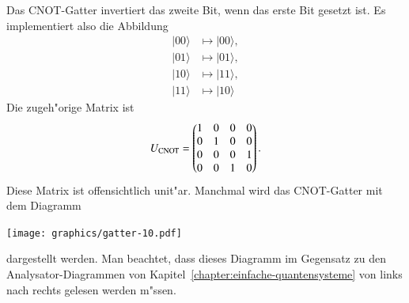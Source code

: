 \begin{beispiel}
Das \textsc{CNOT}-Gatter invertiert das zweite Bit, wenn das erste Bit
gesetzt ist.
Es implementiert also die Abbildung
\begin{align*}
|00\rangle&\mapsto|00\rangle,\\
|01\rangle&\mapsto|01\rangle,\\
|10\rangle&\mapsto|11\rangle,\\
|11\rangle&\mapsto|10\rangle
\end{align*}
Die zugeh"orige Matrix ist
\[
U_{\textsc{CNOT}}=\begin{pmatrix}
1&0&0&0\\
0&1&0&0\\
0&0&0&1\\
0&0&1&0
\end{pmatrix}.
\]
Diese Matrix ist offensichtlich unit"ar.
Manchmal wird das \textsc{CNOT}-Gatter mit dem Diagramm
\begin{center}
\texttt{[image: graphics/gatter-10.pdf]}
\end{center}
dargestellt werden.
Man beachtet, dass dieses Diagramm im Gegensatz zu den Analysator-Diagrammen
von Kapitel~\ref{chapter:einfache-quantensysteme} von links nach rechts
gelesen werden m"ssen.
\end{beispiel}


